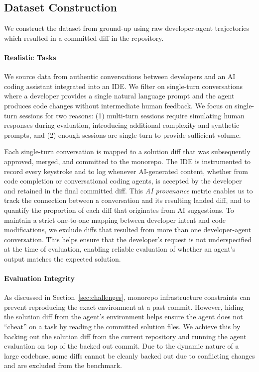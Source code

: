 \subsection{Dataset Construction}
\label{subsec:construction}

We construct the dataset from ground-up using raw developer-agent trajectories which resulted in a committed diff in the repository.

\paragraph{Realistic Tasks}

We source data from authentic conversations between developers and an AI coding assistant integrated into an IDE. We filter on single-turn conversations where a developer provides a single natural language prompt and the agent produces code changes without intermediate human feedback.
We focus on single-turn sessions for two reasons: (1) multi-turn sessions require simulating human responses during evaluation, introducing additional complexity and synthetic prompts, and (2) enough sessions are single-turn to provide sufficient volume.

Each single-turn conversation is mapped to a solution diff that was subsequently approved, merged, and committed to the monorepo. The IDE is instrumented to record every keystroke and to log whenever AI-generated content, whether from code completion or conversational coding agents, is accepted by the developer and retained in the final committed diff. This \emph{AI provenance} metric enables us to track the connection between a conversation and its resulting landed diff, and to quantify the proportion of each diff that originates from AI suggestions. To maintain a strict one-to-one mapping between developer intent and code modifications, we exclude diffs that resulted from more than one developer-agent conversation. This helps ensure that the developer's request is not underspecified at the time of evaluation, enabling reliable evaluation of whether an agent's output matches the expected solution.

\paragraph{Evaluation Integrity}

As discussed in Section~\ref{sec:challenges}, monorepo infrastructure constraints can prevent reproducing the exact environment at a past commit. However, hiding the solution diff from the agent's environment helps ensure the agent does not ``cheat'' on a task by reading the committed solution files. We achieve this by backing out the solution diff from the current repository and running the agent evaluation on top of the backed out commit. Due to the dynamic nature of a large codebase, some diffs cannot be cleanly backed out due to conflicting changes and are excluded from the benchmark.

